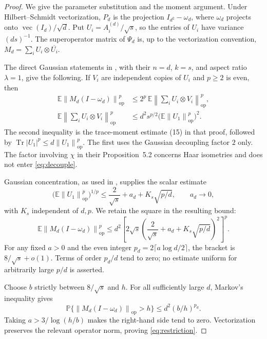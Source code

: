 \documentclass[11pt]{article}
\theoremstyle{remark}
\DeclareMathOperator{\Tr}{Tr}
\newcommand{\E}{\mathbb E}
\newcommand{\Prob}{\mathbb P}
\newcommand{\op}{\mathrm{op}}
\newcommand{\norm}[1]{\left\lVert#1\right\rVert}
\begin{document}
\begin{proof}
We give the parameter substitution and the moment argument.
Under Hilbert--Schmidt vectorization, $P_d$ is the projection
$I_{d^2}-\omega_d$, where $\omega_d$ projects onto
$\operatorname{vec}(I_d)/\sqrt d$. Put
$U_i=A_i^{(d)}/\sqrt s$, so the entries of $U_i$ have variance
$(ds)^{-1}$. The superoperator matrix of $\Psi_d$ is, up to
the vectorization convention,
$M_d=\sum_iU_i\otimes\overline{U_i}$.

The direct Gaussian statements in
\cite[Lemma~5.3 and Proposition~5.4]{GJN}, with their
$n=d$, $k=s$, and aspect ratio $\lambda=1$, give the following.
If $V_i$ are independent copies of $U_i$ and $p\geq2$ is even, then
\begin{align}
 \E\norm{M_d(I-\omega_d)}_{\op}^p
   &\leq 2^p\,\E\norm{\textstyle\sum_iU_i\otimes V_i}_{\op}^p,
                                                   \label{eq:decouple}\\
 \E\norm{\textstyle\sum_iU_i\otimes V_i}_{\op}^p
   &\leq d^2s^{p/2}
      \bigl(\E\norm{U_1}_{\op}^p\bigr)^2.             \label{eq:GJN-trace}
\end{align}
The second inequality is the trace-moment estimate
(15) in that proof, followed by
$\Tr|U_1|^p\leq d\norm{U_1}_{\op}^p$.
The first uses the Gaussian decoupling factor $2$ only.
The factor involving $\chi$ in their Proposition~5.2 concerns
Haar isometries and does not enter \eqref{eq:decouple}.

Gaussian concentration, as used in \cite[(14)]{GJN}, supplies
the scalar estimate
\[
 \bigl(\E\norm{U_1}_{\op}^p\bigr)^{1/p}
  \leq \frac2{\sqrt{s}}+a_d+K_s\sqrt{p/d},
       \qquad a_d\longrightarrow0,
\]
with $K_s$ independent of $d,p$. We retain the square in the
resulting bound:
\begin{equation}
 \E\norm{M_d(I-\omega_d)}_{\op}^p
 \leq d^2
  \left[
    2\sqrt{s}\left(\frac2{\sqrt{s}}
                         +a_d+K_s\sqrt{p/d}\right)^2
  \right]^p.                                      \label{eq:moment-explicit}
\end{equation}
For any fixed $a>0$ and the even integer
$p_d=2\lceil a\log d/2\rceil$, the bracket is
$8/\sqrt{s}+o(1)$. Terms of order $p_d/d$ tend to zero;
no estimate uniform for arbitrarily large $p/d$ is asserted.

Choose $b$ strictly between $8/\sqrt{s}$ and $h$.
For all sufficiently large $d$, Markov's inequality gives
\[
 \Prob\{\norm{M_d(I-\omega_d)}_{\op}>h\}
 \leq d^2(b/h)^{p_d}.
\]
Taking $a>3/\log(h/b)$ makes the right-hand side tend to zero.
Vectorization preserves the relevant operator norm, proving
\eqref{eq:restriction}.
\end{proof}
\end{document}
